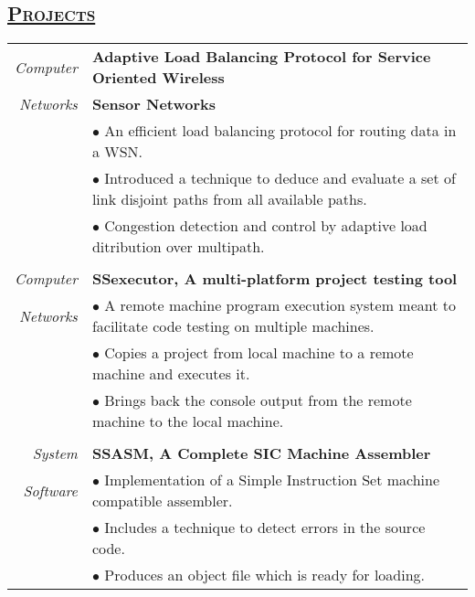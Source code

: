 \documentclass[14pt]{article}
\begin{document}
\subsection* {\scshape\LARGE\uline {Projects}}
\begin{tabularx}{\textwidth}{r X}
\emph{Computer} & \textbf{Adaptive Load Balancing Protocol for Service Oriented Wireless} \\
\emph{Networks} & \textbf{Sensor Networks} \\
                             & $\bullet$  An efficient load balancing protocol for routing data in a WSN. \\
                             & $\bullet$ Introduced a technique to deduce and evaluate a set of link disjoint paths from all available paths. \\
				   & $\bullet$ Congestion detection and control by adaptive load ditribution over multipath. \\
\\
\emph{Computer} & \textbf{SSexecutor, A multi-platform project testing tool} \\
\emph{Networks} & $\bullet$ A remote machine program execution system meant to facilitate code testing on multiple machines. \\
                             & $\bullet$ Copies a project from local machine to a remote machine and executes it. \\
				   & $\bullet$ Brings back the console output from the remote machine to the local machine. \\
\\
\emph{System} & \textbf{SSASM, A Complete SIC Machine Assembler} \\
\emph{Software} & $\bullet$ Implementation of a Simple Instruction Set machine compatible assembler. \\
				& $\bullet$ Includes a technique to detect errors in the source code. \\
				& $\bullet$ Produces an object file which is ready for loading. 
\end{tabularx}
\end{document}

